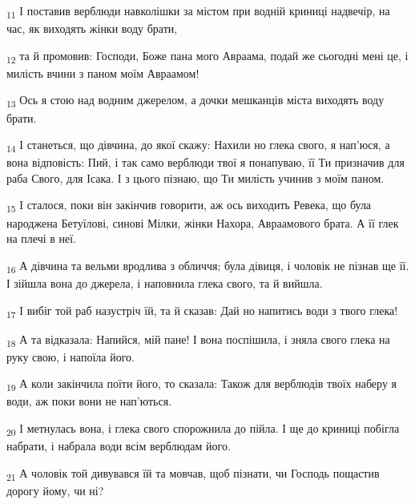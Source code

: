 \begin{tcolorbox}
\textsubscript{11} І поставив верблюди навколішки за містом при водній криниці надвечір, на час, як виходять жінки воду брати,
\end{tcolorbox}
\begin{tcolorbox}
\textsubscript{12} та й промовив: Господи, Боже пана мого Авраама, подай же сьогодні мені це, і милість вчини з паном моїм Авраамом!
\end{tcolorbox}
\begin{tcolorbox}
\textsubscript{13} Ось я стою над водним джерелом, а дочки мешканців міста виходять воду брати.
\end{tcolorbox}
\begin{tcolorbox}
\textsubscript{14} І станеться, що дівчина, до якої скажу: Нахили но глека свого, я нап'юся, а вона відповість: Пий, і так само верблюди твої я понапуваю, її Ти призначив для раба Свого, для Ісака. І з цього пізнаю, що Ти милість учинив з моїм паном.
\end{tcolorbox}
\begin{tcolorbox}
\textsubscript{15} І сталося, поки він закінчив говорити, аж ось виходить Ревека, що була народжена Бетуїлові, синові Мілки, жінки Нахора, Авраамового брата. А її глек на плечі в неї.
\end{tcolorbox}
\begin{tcolorbox}
\textsubscript{16} А дівчина та вельми вродлива з обличчя; була дівиця, і чоловік не пізнав ще її. І зійшла вона до джерела, і наповнила глека свого, та й вийшла.
\end{tcolorbox}
\begin{tcolorbox}
\textsubscript{17} І вибіг той раб назустріч їй, та й сказав: Дай но напитись води з твого глека!
\end{tcolorbox}
\begin{tcolorbox}
\textsubscript{18} А та відказала: Напийся, мій пане! І вона поспішила, і зняла свого глека на руку свою, і напоїла його.
\end{tcolorbox}
\begin{tcolorbox}
\textsubscript{19} А коли закінчила поїти його, то сказала: Також для верблюдів твоїх наберу я води, аж поки вони не нап'ються.
\end{tcolorbox}
\begin{tcolorbox}
\textsubscript{20} І метнулась вона, і глека свого спорожнила до пійла. І ще до криниці побігла набрати, і набрала води всім верблюдам його.
\end{tcolorbox}
\begin{tcolorbox}
\textsubscript{21} А чоловік той дивувався їй та мовчав, щоб пізнати, чи Господь пощастив дорогу йому, чи ні?
\end{tcolorbox}
